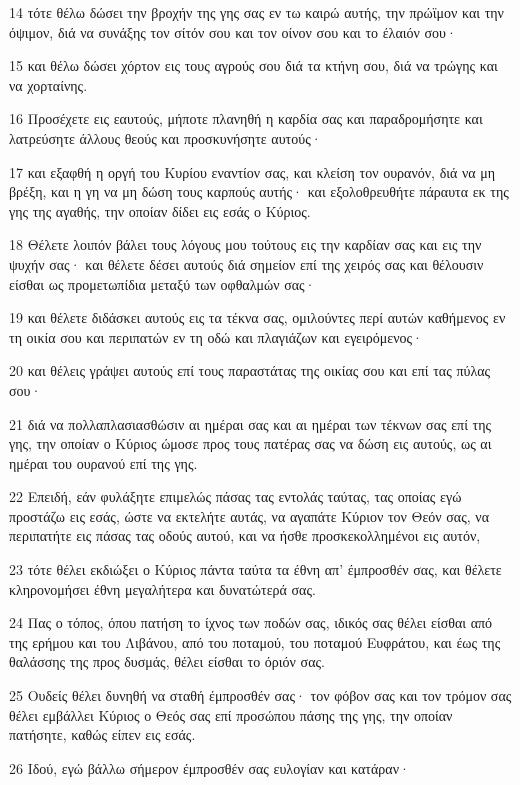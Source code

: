 \par 14 τότε θέλω δώσει την βροχήν της γης σας εν τω καιρώ αυτής, την πρώϊμον και την όψιμον, διά να συνάξης τον σίτόν σου και τον οίνον σου και το έλαιόν σου·
\par 15 και θέλω δώσει χόρτον εις τους αγρούς σου διά τα κτήνη σου, διά να τρώγης και να χορταίνης.
\par 16 Προσέχετε εις εαυτούς, μήποτε πλανηθή η καρδία σας και παραδρομήσητε και λατρεύσητε άλλους θεούς και προσκυνήσητε αυτούς·
\par 17 και εξαφθή η οργή του Κυρίου εναντίον σας, και κλείση τον ουρανόν, διά να μη βρέξη, και η γη να μη δώση τους καρπούς αυτής· και εξολοθρευθήτε πάραυτα εκ της γης της αγαθής, την οποίαν δίδει εις εσάς ο Κύριος.
\par 18 Θέλετε λοιπόν βάλει τους λόγους μου τούτους εις την καρδίαν σας και εις την ψυχήν σας· και θέλετε δέσει αυτούς διά σημείον επί της χειρός σας και θέλουσιν είσθαι ως προμετωπίδια μεταξύ των οφθαλμών σας·
\par 19 και θέλετε διδάσκει αυτούς εις τα τέκνα σας, ομιλούντες περί αυτών καθήμενος εν τη οικία σου και περιπατών εν τη οδώ και πλαγιάζων και εγειρόμενος·
\par 20 και θέλεις γράψει αυτούς επί τους παραστάτας της οικίας σου και επί τας πύλας σου·
\par 21 διά να πολλαπλασιασθώσιν αι ημέραι σας και αι ημέραι των τέκνων σας επί της γης, την οποίαν ο Κύριος ώμοσε προς τους πατέρας σας να δώση εις αυτούς, ως αι ημέραι του ουρανού επί της γης.
\par 22 Επειδή, εάν φυλάξητε επιμελώς πάσας τας εντολάς ταύτας, τας οποίας εγώ προστάζω εις εσάς, ώστε να εκτελήτε αυτάς, να αγαπάτε Κύριον τον Θεόν σας, να περιπατήτε εις πάσας τας οδούς αυτού, και να ήσθε προσκεκολλημένοι εις αυτόν,
\par 23 τότε θέλει εκδιώξει ο Κύριος πάντα ταύτα τα έθνη απ' έμπροσθέν σας, και θέλετε κληρονομήσει έθνη μεγαλήτερα και δυνατώτερά σας.
\par 24 Πας ο τόπος, όπου πατήση το ίχνος των ποδών σας, ιδικός σας θέλει είσθαι από της ερήμου και του Λιβάνου, από του ποταμού, του ποταμού Ευφράτου, και έως της θαλάσσης της προς δυσμάς, θέλει είσθαι το όριόν σας.
\par 25 Ουδείς θέλει δυνηθή να σταθή έμπροσθέν σας· τον φόβον σας και τον τρόμον σας θέλει εμβάλλει Κύριος ο Θεός σας επί προσώπου πάσης της γης, την οποίαν πατήσητε, καθώς είπεν εις εσάς.
\par 26 Ιδού, εγώ βάλλω σήμερον έμπροσθέν σας ευλογίαν και κατάραν·
